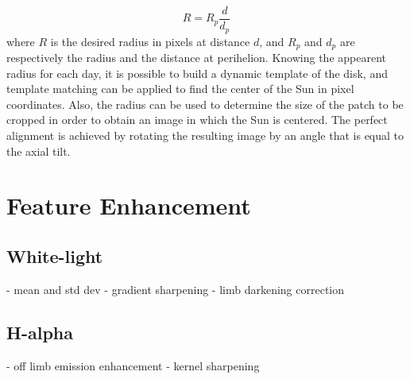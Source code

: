 \begin{equation}
  R = R_p\frac{d}{d_p}
\end{equation}
where $R$ is the desired radius in pixels at distance $d$, and $R_p$ and $d_p$ are respectively the radius and the distance at perihelion.
\bigbreak
Knowing the appearent radius for each day, it is possible to build a dynamic template of the disk, and template matching can be applied to find the center of the Sun in pixel coordinates. Also, the radius can be used to determine the size of the patch to be cropped in order to obtain an image in which the Sun is centered. The perfect alignment is achieved by rotating the resulting image by an angle that is equal to the axial tilt.

\section{Feature Enhancement}
\subsection{White-light}















- mean and std dev
- gradient sharpening
- limb darkening correction




\subsection{H-alpha}

- off limb emission enhancement
- kernel sharpening

























